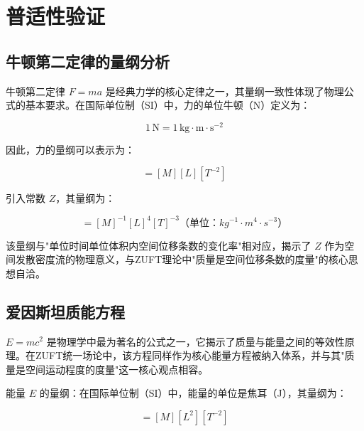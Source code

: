 \documentclass[12pt,a4paper]{article}
\begin{document}
\section{普适性验证}
\label{section:universality_verification}

\subsection{牛顿第二定律的量纲分析}
\label{subsection:newton_second_law_dimension}

牛顿第二定律 $F = m a$ 是经典力学的核心定律之一，其量纲一致性体现了物理公式的基本要求。在国际单位制（SI）中，力的单位牛顿（N）定义为：

\begin{equation}
1 \, \text{N} = 1 \, \text{kg} \cdot \text{m} \cdot \text{s}^{-2}

\end{equation}

因此，力的量纲可以表示为：

\begin{equation}
[F] = [M] [L] [T^{-2}]

\end{equation}

引入常数 $Z$，其量纲为：

\begin{equation}
[Z] = [M]^{-1}[L]^{4}[T]^{-3}（单位：kg^{-1} \cdot m^4 \cdot s^{-3}）

\end{equation}

该量纲与"单位时间单位体积内空间位移条数的变化率"相对应，揭示了 $Z$ 作为空间发散密度流的物理意义，与ZUFT理论中"质量是空间位移条数的度量"的核心思想自洽。

\subsection{爱因斯坦质能方程}
\label{subsection:einstein_energy_mass}

$E = m c^2$ 是物理学中最为著名的公式之一，它揭示了质量与能量之间的等效性原理。在ZUFT统一场论中，该方程同样作为核心能量方程被纳入体系，并与其"质量是空间运动程度的度量"这一核心观点相容。

能量 $E$ 的量纲：在国际单位制（SI）中，能量的单位是焦耳（J），其量纲为：

\begin{equation}
[E] = [M][L^2][T^{-2}]

\end{equation}
\end{document}
